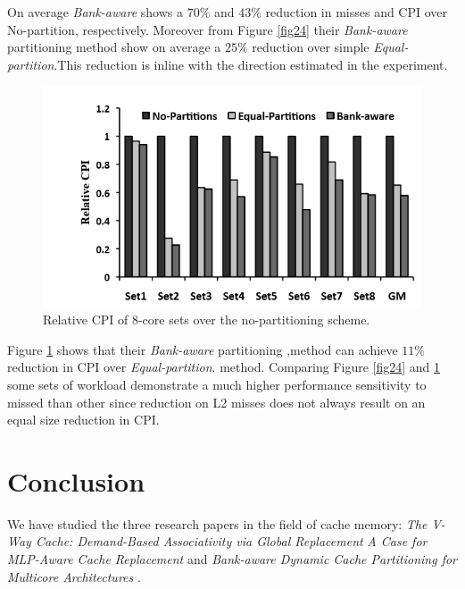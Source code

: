 \documentclass{report}
\begin{document}
On average \emph{Bank-aware} shows a $70\%$ and $43\%$ reduction in misses and CPI over No-partition, respectively. Moreover from Figure \ref{fig24} their
 \emph{Bank-aware}  partitioning method  show on average a $25\%$ reduction over simple \emph{Equal-partition}.This reduction is inline with the direction estimated in the experiment.\vspace{.8cm}

\begin{figure}[h!]
\includegraphics[width=1\textwidth]{./fig25}
\caption{ Relative CPI of 8-core sets over the no-partitioning scheme.}
\label{fig25}
\end{figure}
\vspace{.8cm}

Figure \ref{fig25} shows that their  \emph{Bank-aware}  partitioning ,method can achieve $11\%$ reduction in CPI over \emph{Equal-partition}. method. Comparing Figure \ref{fig24} and \ref{fig25} some sets of workload demonstrate a much higher performance sensitivity to missed than other since reduction on L2 misses does not always result on an equal size  reduction in CPI.

\chapter{Conclusion}

We have studied the three research papers in the field of cache memory: \textit{The V-Way Cache: Demand-Based Associativity via Global Replacement}
  \cite{Qureshi2005TheVC}\textit{A Case for MLP-Aware Cache Replacement}\cite{Qureshi2006ACF} and \textit{Bank-aware Dynamic Cache Partitioning for Multicore Architectures} \cite{Kaseridis2009BankawareDC} . \vspace{.8cm}
\end{document}
